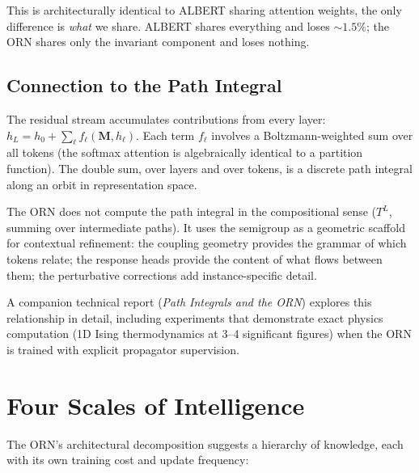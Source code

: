 \documentclass[11pt, a4paper]{article}
\newcommand{\M}{\mathbf{M}}
\theoremstyle{plain}
\theoremstyle{remark}
\begin{document}
This is architecturally identical to ALBERT sharing attention weights, the only difference is \emph{what} we share.
ALBERT shares everything and loses ${\sim}1.5\%$; the ORN shares only the invariant component and loses nothing.

\subsection{Connection to the Path Integral}

The residual stream accumulates contributions from every layer:
$h_L = h_0 + \sum_\ell f_\ell(\M, h_\ell)$.
Each term $f_\ell$ involves a Boltzmann-weighted sum over all tokens (the softmax attention is algebraically identical to a partition function).
The double sum, over layers and over tokens, is a discrete path integral along an orbit in representation space.

The ORN does not compute the path integral in the compositional sense ($T^L$, summing over intermediate paths).
It uses the semigroup as a geometric scaffold for contextual refinement: the coupling geometry provides the grammar of which tokens relate; the response heads provide the content of what flows between them; the perturbative corrections add instance-specific detail.

A companion technical report (\textit{Path Integrals and the ORN}) explores this relationship in detail, including experiments that demonstrate exact physics computation (1D Ising thermodynamics at 3--4 significant figures) when the ORN is trained with explicit propagator supervision.


\section{Four Scales of Intelligence}

The ORN's architectural decomposition suggests a hierarchy of knowledge, each with its own training cost and update frequency:
\end{document}
